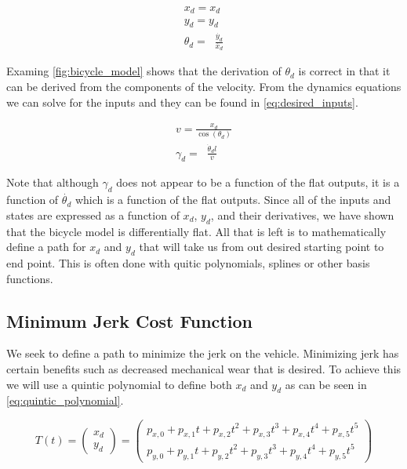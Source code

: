 \documentclass{article}
\DeclareMathOperator{\taninv}{\tan^{-1}}
\begin{document}
\begin{equation}
  \begin{aligned}
    x_d = x_d \\
    y_d = y_d \\
    \theta_d = \taninv{\frac{\dot{y_d}}{\dot{x_d}}}
  \end{aligned}
  \label{eq:desired_states}
\end{equation}

Examing \cref{fig:bicycle_model} shows that the derivation of $\theta_d$ is correct in that
it can be derived from the components of the velocity. From the dynamics equations we can solve for the inputs and they can 
be found in \cref{eq:desired_inputs}.

\begin{equation}
  \begin{aligned}
    v = \frac{x_d}{\cos(\theta_d)} \\
    \gamma_d = \taninv{\frac{\dot{\theta}_d l}{v}}
  \end{aligned}
  \label{eq:desired_inputs}
\end{equation}

Note that although $\gamma_d$ does not appear to be a function of the flat outputs, it is a function
of $\dot{\theta_d}$ which is a function of the flat outputs. Since all of the inputs and states are expressed as a function of $x_d$, $y_d$, and 
their derivatives, we have shown that the bicycle model is differentially flat. All that is 
left is to mathematically define a path for $x_d$ and $y_d$ that will take us from out desired 
starting point to end point. This is often done with quitic polynomials, splines or other basis functions.

\subsection{Minimum Jerk Cost Function}

We seek to define a path to minimize the jerk on the vehicle. Minimizing jerk has 
certain benefits such as decreased mechanical wear that is desired. To achieve this
we will use a quintic polynomial to define both $x_d$ and $y_d$ as can be seen in \cref{eq:quintic_polynomial}.

\begin{equation}
  T(t) =\begin{pmatrix}
x_d\\y_d 

\end{pmatrix} = \begin{pmatrix}
p_{x,0} + p_{x,1}t + p_{x,2}t^2 + p_{x,3}t^3 + p_{x,4}t^4 + p_{x,5}t^5\\

p_{y,0} + p_{y,1}t + p_{y,2}t^2 + p_{y,3}t^3 + p_{y,4}t^4 + p_{y,5}t^5 

\end{pmatrix}
\label{eq:quintic_polynomial}
\end{equation}
\end{document}
